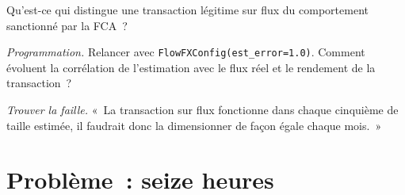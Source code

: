 \begin{exercise}[$\star\star$]\label{exo:s2:fx-flow-strategies:6}
Qu'est-ce qui distingue une transaction légitime sur flux du comportement sanctionné par la FCA~?
\end{exercise}

\begin{exercise}[$\star\star\star$]\label{exo:s2:fx-flow-strategies:7}
\emph{Programmation.} Relancer avec \texttt{FlowFXConfig(est\_error=1.0)}. Comment évoluent la corrélation de l'estimation avec le flux réel et le rendement de la transaction~?
\end{exercise}

\begin{exercise}[$\star\star\star$]\label{exo:s2:fx-flow-strategies:8}
\emph{Trouver la faille.} «~La transaction sur flux fonctionne dans chaque cinquième de taille estimée, il faudrait donc la dimensionner de façon égale chaque mois.~»
\end{exercise}

\section{Problème~: seize heures}

